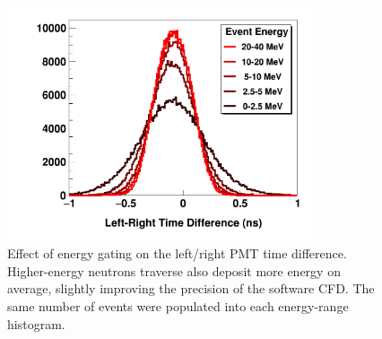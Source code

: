 
\begin{figure}[h]
    \centering
    \includegraphics[width=0.8\textwidth]{figures/LRDifferenceByEnergy.png}
    \caption[Effect of energy gating on left/right PMT time difference]
    {
        Effect of energy gating on the left/right PMT time difference. Higher-energy neutrons 
        traverse also deposit more energy on average, slightly improving the
        precision of the software CFD. The same number of events were populated into each
        energy-range histogram.
    }
    \label{LRTimeDifferenceByEnergy}
\end{figure}

